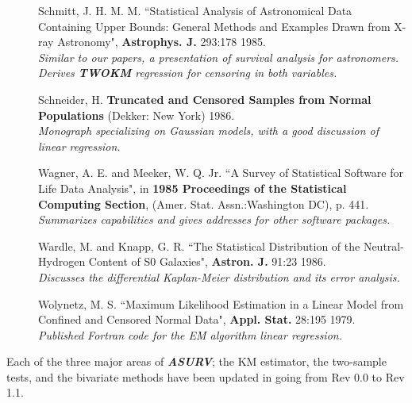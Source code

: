 \begin{description}
\item [] Schmitt, J. H. M. M. ``Statistical Analysis of Astronomical Data 
    Containing Upper Bounds: General Methods and Examples Drawn from X-ray 
    Astronomy", {\bf Astrophys. J.} 293:178 1985.\\
    {\it Similar to our papers, a presentation of survival analysis for 
    astronomers.  Derives {\sl\bf TWOKM} regression for censoring in both 
    variables.}

\item [] Schneider, H. {\bf Truncated and Censored Samples from Normal 
    Populations} (Dekker: New York) 1986.\\
    {\it Monograph specializing on Gaussian models, with a good discussion of 
    linear regression.}

\item [] Wagner, A. E. and Meeker, W. Q. Jr. ``A Survey of Statistical Software
    for Life Data Analysis", in {\bf 1985 Proceedings of the Statistical 
    Computing Section}, (Amer. Stat. Assn.:Washington DC), p. 441.\\
    {\it Summarizes capabilities and gives addresses for other software
     packages.}

\item [] Wardle, M. and Knapp, G. R. ``The Statistical Distribution of the 
    Neutral-Hydrogen Content of S0 Galaxies", {\bf Astron. J.} 91:23 1986.\\
    {\it Discusses the differential Kaplan-Meier distribution and its error
    analysis.}

\item [] Wolynetz, M. S. ``Maximum Likelihood Estimation in a Linear Model 
    from     Confined and Censored Normal Data", {\bf Appl. Stat.} 28:195 
    1979.\\
    {\it Published Fortran code for the EM algorithm linear regression.}

\end{description}

\bigskip
\bigskip



     Each of the three major areas of {\sl\bf ASURV}; the KM 
estimator, the two-sample tests, and the bivariate methods have been 
updated in going from Rev 0.0 to Rev 1.1. 


